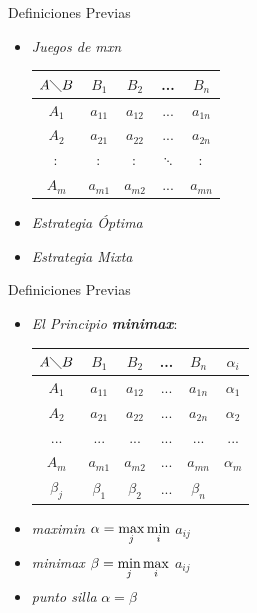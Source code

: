 \documentclass[10pt]{beamer}
\begin{document}
\begin{frame}[fragile]{Definiciones Previas}
	
	\begin{itemize}
		\item\textit{Juegos de mxn}\\
		\begin{table}
			\begin{tabular}{|c|c|c|c|c|}
				\hline 
				$A \diagdown B$ & $B_{1}$ & $B_{2}$ & ... & $B_{n}$ \\ 
				\hline 
				$A_{1}$ & $a_{11}$ & $a_{12}$ & ... & $a_{1n}$ \\ 
				\hline 
				$A_{2}$ & $a_{21}$ & $a_{22}$ & ... & $a_{2n}$ \\ 
				\hline 
				$\colon$& $\colon$ & $\colon$ & $\ddots$ & $\colon$ \\ 
				\hline 
				$A_{m}$ & $a_{m1}$ & $a_{m2}$ & ... & $a_{mn}$ \\ 
				\hline 
			\end{tabular} 
		\end{table}
		\item\textit{Estrategia Óptima}
		\item\textit{Estrategia Mixta}
		
	\end{itemize}
	
\end{frame}
\begin{frame}[fragile]{Definiciones Previas}
	
	\begin{itemize}
		\item\textit{El Principio \textbf{\textit{minimax}}}: 
		\begin{table}
			\begin{tabular}{|c|c|c|c|c||c|}
				\hline 
				$A \diagdown B$ & $B_{1}$ & $B_{2}$ & ... & $B_{n}$ & $\alpha_{i}$ \\ 
				\hline 
				$A_{1}$ & $a_{11}$ & $a_{12}$ & ... & $a_{1n}$ & $\alpha_{1}$ \\ 
				\hline 
				$A_{2}$ & $a_{21}$ & $a_{22}$ & ... & $a_{2n}$ & $\alpha_{2}$ \\ 
				\hline 
				... & ... & ... & ... & ... & ... \\ 
				\hline 
				$A_{m}$ &$ a_{m1}$ & $a_{m2}$ & ... & $a_{mn}$ & $\alpha_{m}$ \\ 
				\hline 
				\hline
				$\beta_{j}$ & $\beta_{1}$ & $\beta_{2}$ & ... & $\beta_{n}$ &\\
				\hline
			\end{tabular} 
		\end{table}
		\item \textit{maximin} $\alpha=\smash{\displaystyle\max_{j}\min_{i}}$ $a_{ij}$
		\item \textit{minimax} $\beta=\smash{\displaystyle\min_{j}\max_{i}}$ $a_{ij}$
		\item \textit{punto silla} $\alpha=\beta$
		
		
	\end{itemize}
	
	
\end{frame}
\end{document}
